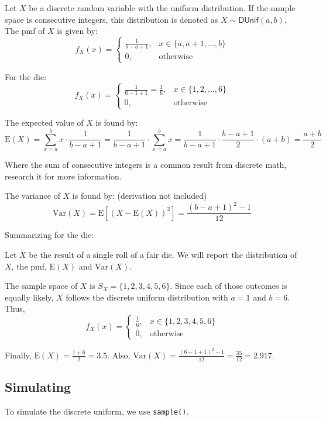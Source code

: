 \documentclass[
  letterpaper,
  DIV=11,
  numbers=noendperiod]{scrreprt}
\begin{document}
Let \(X\) be a discrete random variable with the uniform distribution.
If the sample space is consecutive integers, this distribution is
denoted as \(X\sim\textsf{DUnif}(a,b)\). The pmf of \(X\) is given by:
\[
f_X(x)=\left\{\begin{array}{ll}\frac{1}{b-a+1}, & x \in \{a, a+1,...,b\} \\ 
0, & \mbox{otherwise} \end{array}\right.
\]

For the die:\\
\[
f_X(x)=\left\{\begin{array}{ll}\frac{1}{6-1+1} = \frac{1}{6}, & x \in \{1, 2,...,6\} \\ 
0, & \mbox{otherwise} \end{array}\right.
\]

The expected value of \(X\) is found by: \[
\mbox{E}(X)=\sum_{x=a}^b x\cdot\frac{1}{b-a+1}= \frac{1}{b-a+1} \cdot \sum_{x=a}^b x=\frac{1}{b-a+1}\cdot\frac{b-a+1}{2}\cdot (a+b) = \frac{a+b}{2}
\]

Where the sum of consecutive integers is a common result from discrete
math, research it for more information.

The variance of \(X\) is found by: (derivation not included) \[
\mbox{Var}(X)=\mbox{E}[(X-\mbox{E}(X))^2]=\frac{(b-a+1)^2-1}{12}
\]

Summarizing for the die:

Let \(X\) be the result of a single roll of a fair die. We will report
the distribution of \(X\), the pmf, \(\mbox{E}(X)\) and
\(\mbox{Var}(X)\).

The sample space of \(X\) is \(S_X=\{1,2,3,4,5,6\}\). Since each of
those outcomes is equally likely, \(X\) follows the discrete uniform
distribution with \(a=1\) and \(b=6\). Thus, \[
f_X(x)=\left\{\begin{array}{ll}\frac{1}{6}, & x \in \{1,2,3,4,5,6\} \\ 
0, & \mbox{otherwise} \end{array}\right.
\]

Finally, \(\mbox{E}(X)=\frac{1+6}{2}=3.5\). Also,
\(\mbox{Var}(X)=\frac{(6-1+1)^2-1}{12}=\frac{35}{12}=2.917\).

\subsection{Simulating}\label{simulating}

To simulate the discrete uniform, we use \texttt{sample()}.
\end{document}
